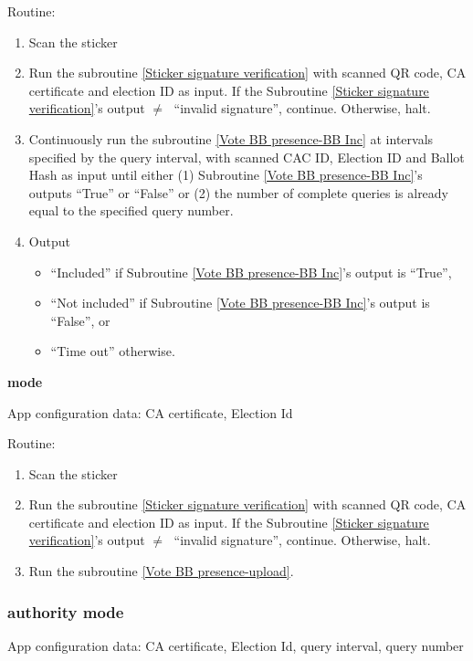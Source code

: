 \documentclass{article}
\begin{document}
Routine:
\begin{enumerate}
    \item Scan the sticker
    \item Run the subroutine \ref{Sticker signature verification} with scanned QR code, CA certificate and election ID as input. If the Subroutine \ref{Sticker signature verification}'s output $\neq\;$ ``invalid signature'', continue. Otherwise, halt.
    \item Continuously run the subroutine \ref{Vote BB presence-BB Inc} at intervals specified by the query interval, with scanned CAC ID, Election ID and Ballot Hash as input until either (1) Subroutine \ref{Vote BB presence-BB Inc}'s outputs ``True'' or ``False'' or (2) the number of complete queries is already equal to the specified query number. 
    \item Output 
    \begin{itemize}
        \item ``Included'' if Subroutine \ref{Vote BB presence-BB Inc}'s output is ``True'',
        \item ``Not included'' if Subroutine \ref{Vote BB presence-BB Inc}'s output is ``False'', or
        \item ``Time out'' otherwise.
    \end{itemize}
    
\end{enumerate}

\textbf{\StickerBBUpload{}{} mode}

App configuration data: CA certificate, Election Id


Routine:
\begin{enumerate}
    \item Scan the sticker
    \item Run the subroutine \ref{Sticker signature verification} with scanned QR code, CA certificate and election ID as input. If the Subroutine \ref{Sticker signature verification}'s output $\neq\;$ ``invalid signature'', continue. Otherwise, halt.
    \item Run the subroutine \ref{Vote BB presence-upload}.
\end{enumerate}

\subsubsection{\remoteVotingCenter{} authority mode}


App configuration data: CA certificate, Election Id, query interval, query number
\end{document}
